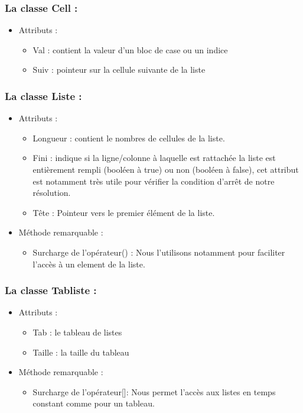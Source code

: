 \documentclass{article}
\begin{document}
\subsubsection{La classe Cell :}
\begin{itemize}
\item Attributs :
\begin{itemize}
\item Val : contient la valeur d'un bloc de case ou un indice
\item Suiv : pointeur sur la cellule suivante de la liste
\end{itemize}
\end{itemize}
\subsubsection{La classe Liste :}
\begin{itemize}
\item Attributs :
\begin{itemize}
\item Longueur : contient le nombres de cellules de la liste.
\item Fini : indique si la ligne/colonne à laquelle est rattachée la liste est entièrement rempli (booléen à true) ou non (booléen à false), cet attribut est
notamment très utile pour vérifier la condition d'arrêt de notre résolution.
\item Tête : Pointeur vers le premier élément de la liste.
\end{itemize}
\item Méthode remarquable :
\begin{itemize}
\item Surcharge de l'opérateur() : Nous l'utilisons notamment pour faciliter l'accès à un element de la liste.
\end{itemize}
\end{itemize}
\subsubsection{La classe Tabliste :}
\begin{itemize}
\item Attributs :
\begin{itemize}
\item Tab : le tableau de listes
\item Taille : la taille du tableau
\end{itemize}
\item Méthode remarquable :
\begin{itemize}
\item Surcharge de l'opérateur[]: Nous permet l'accès aux listes en temps constant comme pour un tableau.
\end{itemize}
\end{itemize}
\end{document}
